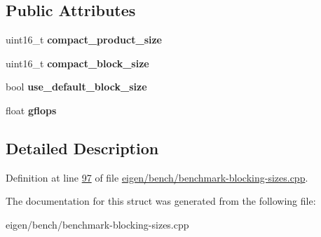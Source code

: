 \subsection*{Public Attributes}
\begin{DoxyCompactItemize}
\item 
\mbox{\label{structbenchmark__t_a9daac3ed3f78be5a441a6271df6d8a36}} 
uint16\+\_\+t {\bfseries compact\+\_\+product\+\_\+size}
\item 
\mbox{\label{structbenchmark__t_a718d3e937e0bc4f9ddd2c102b4af39d3}} 
uint16\+\_\+t {\bfseries compact\+\_\+block\+\_\+size}
\item 
\mbox{\label{structbenchmark__t_a1de17399757f6c84cc6c650bf313ffdc}} 
bool {\bfseries use\+\_\+default\+\_\+block\+\_\+size}
\item 
\mbox{\label{structbenchmark__t_a2858de6c66ef215a3ef7b98f389b8350}} 
float {\bfseries gflops}
\end{DoxyCompactItemize}


\subsection{Detailed Description}


Definition at line \hyperlink{eigen_2bench_2benchmark-blocking-sizes_8cpp_source_l00097}{97} of file \hyperlink{eigen_2bench_2benchmark-blocking-sizes_8cpp_source}{eigen/bench/benchmark-\/blocking-\/sizes.\+cpp}.



The documentation for this struct was generated from the following file\+:\begin{DoxyCompactItemize}
\item 
eigen/bench/benchmark-\/blocking-\/sizes.\+cpp\end{DoxyCompactItemize}
